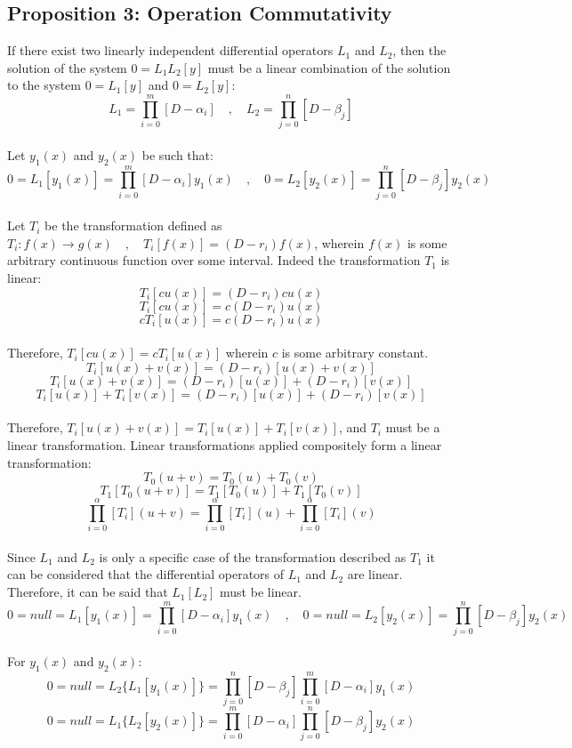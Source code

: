 \subsection{Proposition 3: Operation Commutativity}
\begin{comment}
\end{comment}
If there exist two linearly independent differential operators $L_1$ and $L_2$, then the solution of the system $0 = L_1L_2[y]$ must be a linear combination of the solution to the system $0 = L_1[y]$ and $0 = L_2[y]$:
$$L_1=\prod_{i = 0}^{m}\left[D - \alpha_{i}\right] \quad,\quad L_2=\prod_{j = 0}^{n}\left[D - \beta_{j}\right]$$
\\Let $y_1(x)$ and $y_2(x)$ be such that:
$$0 = L_1[y_1(x)]=\prod_{i = 0}^{m}\left[D - \alpha_{i}\right]y_1(x) \quad,\quad 0 = L_2[y_2(x)]=\prod_{j = 0}^{n}\left[D - \beta_{j}\right]y_2(x)$$
\\Let $T_i$ be the transformation defined as $T_i: f(x) \to g(x)\quad , \quad T_i[f(x)] = (D - r_i)f(x) $, wherein $f(x)$ is some arbitrary continuous function over some interval. Indeed the transformation $T_1$ is linear:
$$T_i[cu(x)] = (D - r_i)cu(x)$$ 
$$T_i[cu(x)] = c(D - r_i)u(x)$$
$$cT_i[u(x)] = c(D - r_i)u(x)$$
\\Therefore, $T_i[cu(x)] = cT_i[u(x)]$ wherein $c$ is some arbitrary constant.
$$T_i[u(x) + v(x)] = (D - r_i)[u(x) + v(x)]$$
$$T_i[u(x) + v(x)] = (D - r_i)[u(x)] + (D - r_i)[v(x)]$$
$$T_i[u(x)] + T_i[v(x)] = (D - r_i)[u(x)] + (D - r_i)[v(x)]$$
\\Therefore, $T_i[u(x) +v(x)] = T_i[u(x)] + T_i[v(x)]$, and $T_i$ must be a linear transformation. Linear transformations applied compositely form a linear transformation:
$$T_0(u + v) = T_0(u) + T_0(v)$$
$$T_1[T_0(u + v)] = T_1[T_0(u)] + T_1[T_0(v)]$$
$$\prod_{i = 0}^{\alpha}\left[T_i\right](u + v) = \prod_{i = 0}^{\alpha}\left[T_i\right](u) + \prod_{i = 0}^{\alpha}\left[T_i\right](v)$$
\\Since $L_1$ and $L_2$ is only a specific case of the transformation described as $T_1$ it can be considered that the differential operators of $L_1$ and $L_2$ are linear. Therefore, it can be said that $L_1[L_2]$ must be linear. 
$$0 =null = L_1[y_1(x)]=\prod_{i = 0}^{m}\left[D - \alpha_{i}\right]y_1(x)\quad,\quad 0 = null = L_2[y_2(x)]=\prod_{j = 0}^{n}\left[D - \beta_{j}\right]y_2(x)$$
\\For $y_1(x)$ and $y_2(x)$:
$$0 =null = L_2\{L_1[y_1(x)]\}=\prod_{j = 0}^{n}\left[D - \beta_{j}\right]\prod_{i = 0}^{m}\left[D - \alpha_{i}\right]y_1(x)$$
$$0 = null = L_1\{L_2[y_2(x)]\} = \prod_{i = 0}^{m}\left[D - \alpha_{i}\right]\prod_{j = 0}^{n}\left[D - \beta_{j}\right]y_2(x)$$
